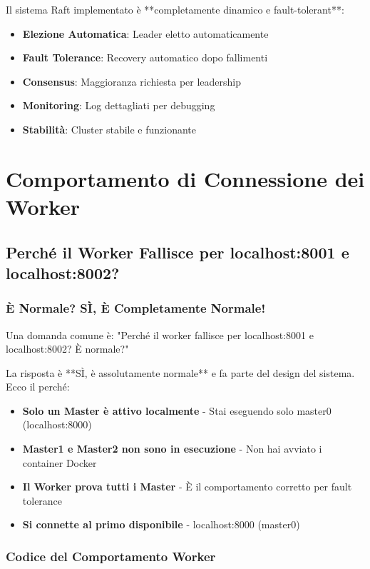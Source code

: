 \documentclass[12pt,a4paper]{article}
\begin{document}
Il sistema Raft implementato è **completamente dinamico e fault-tolerant**:

\begin{itemize}
\item \textbf{Elezione Automatica}: Leader eletto automaticamente
\item \textbf{Fault Tolerance}: Recovery automatico dopo fallimenti
\item \textbf{Consensus}: Maggioranza richiesta per leadership
\item \textbf{Monitoring}: Log dettagliati per debugging
\item \textbf{Stabilità}: Cluster stabile e funzionante
\end{itemize}

\section{Comportamento di Connessione dei Worker}

\subsection{Perché il Worker Fallisce per localhost:8001 e localhost:8002?}

\subsubsection{È Normale? SÌ, È Completamente Normale!}

Una domanda comune è: "Perché il worker fallisce per localhost:8001 e localhost:8002? È normale?"

La risposta è **SÌ, è assolutamente normale** e fa parte del design del sistema. Ecco il perché:

\begin{itemize}
\item \textbf{Solo un Master è attivo localmente} - Stai eseguendo solo master0 (localhost:8000)
\item \textbf{Master1 e Master2 non sono in esecuzione} - Non hai avviato i container Docker
\item \textbf{Il Worker prova tutti i Master} - È il comportamento corretto per fault tolerance
\item \textbf{Si connette al primo disponibile} - localhost:8000 (master0)
\end{itemize}

\subsubsection{Codice del Comportamento Worker}
\end{document}
